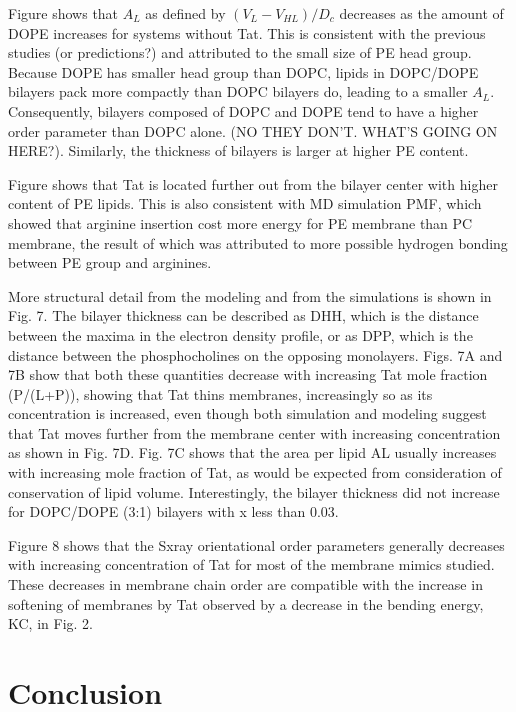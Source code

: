 \documentclass[12pt,letterpaper]{article}
\begin{document}
Figure shows that $A_L$ as defined by $(V_L-V_{HL})/D_c$ decreases as the 
amount of DOPE increases for systems without Tat. This is consistent with the
previous studies (or predictions?) and attributed to the small size of PE
head group. Because DOPE has smaller head group than DOPC, lipids in DOPC/DOPE
bilayers pack more compactly than DOPC bilayers do, leading to a smaller $A_L$.
Consequently, bilayers composed of DOPC and DOPE tend to have a higher order 
parameter than DOPC alone. (NO THEY DON'T. WHAT'S GOING ON HERE?). Similarly,
the thickness of bilayers is larger at higher PE content. 

Figure shows that Tat is located further out from the bilayer center with 
higher content of PE lipids. This is also consistent with MD simulation PMF,
which showed that arginine insertion cost more energy for PE membrane than
PC membrane, the result of which was attributed to more possible hydrogen 
bonding between PE group and arginines.



More structural detail from the modeling and from the simulations is shown in 
Fig. 7. The bilayer thickness can be described as DHH, which is the 
distance between the maxima in the electron density profile, or as DPP, which 
is the distance between the phosphocholines on the opposing monolayers. Figs. 
7A and 7B show that both these quantities decrease with increasing Tat mole 
fraction (P/(L+P)), showing that Tat thins membranes, increasingly so as its 
concentration is increased, even though both simulation and modeling suggest 
that Tat moves further from the membrane center with increasing concentration 
as shown in Fig. 7D.  Fig. 7C shows that the area per lipid AL usually increases 
with increasing mole fraction of Tat, as would be expected from consideration of 
conservation of lipid volume. Interestingly, the bilayer thickness did not 
increase for DOPC/DOPE (3:1) bilayers with x less than 0.03.  

Figure 8 shows that the Sxray orientational order parameters generally 
decreases with increasing concentration of Tat for most of the membrane mimics 
studied.  These decreases in membrane chain order are compatible with the 
increase in softening of membranes by Tat observed by a decrease in the bending
energy, KC, in Fig. 2.

\section{Conclusion}



%
%
%
\end{document}
